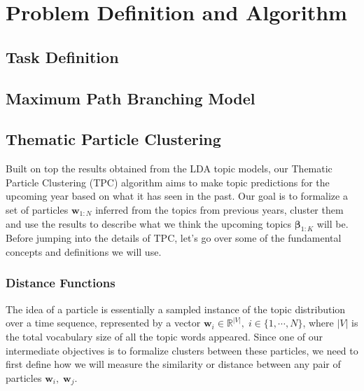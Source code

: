 \documentclass[conference]{IEEEtran}
\begin{document}
\section{Problem Definition and Algorithm}


\subsection{Task Definition}


\subsection{Maximum Path Branching Model}

\subsection{Thematic Particle Clustering}

Built on top the results obtained from the LDA topic models, our Thematic Particle Clustering (TPC) algorithm aims to make topic predictions for the upcoming year based on what it has seen in the past. Our goal is to formalize a set of particles $\mathbf{w}_{1:N}$ inferred from the topics from previous years, cluster them and use the results to describe what we think the upcoming topics $\mathbf{\beta}_{1:K}$ will be. Before jumping into the details of TPC, let's go over some of the fundamental concepts and definitions we will use.

\subsubsection{Distance Functions}
The idea of a particle is essentially a sampled instance of the topic distribution over a time sequence, represented by a vector $\mathbf{w}_i\in \mathbb{R}^{|V|},\; i \in \{1,\cdots,N\}$, where $|V|$ is the total vocabulary size of all the topic words appeared. Since one of our intermediate objectives is to formalize clusters between these particles, we need to first define how we will measure the similarity or distance between any pair of particles $\mathbf{w}_i,\; \mathbf{w}_j$. 
\end{document}
